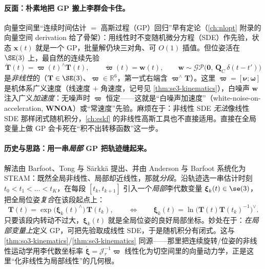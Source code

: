 \paragraph{反面：朴素地把 GP 搬上李群会卡住。}
向量空间里“连续时间估计 $=$ 高斯过程（GP）回归”早有定论（\cref{ch:nlopt} 附录的向量空间 derivation 给了骨架）：用线性时不变随机微分方程（SDE）作先验，状态 $\mathbf{x}(t)$ 就是一个 GP，批量解仍块三对角、可 $O(1)$ 插值。但位姿活在 $\SE(3)$ 上，最自然的连续先验
\begin{equation}
  \dot{\mathbf{T}}(t)=\boldsymbol{\varpi}(t)^\wedge\mathbf{T}(t),\qquad
  \dot{\boldsymbol{\varpi}}(t)=\mathbf{w}(t),\qquad
  \mathbf{w}\sim\mathcal{GP}\big(\mathbf{0},\,\mathbf{Q}_C\,\delta(t-t')\big)
  \label{eq:steam-global-sde}
\end{equation}
是\emph{非线性}的（$\mathbf{T}\in\SE(3)$、$\boldsymbol{\varpi}\in\mathbb{R}^6$，第一式右端含 $\boldsymbol{\varpi}^\wedge\mathbf{T}$）。这里 $\boldsymbol{\varpi}=[\boldsymbol{\nu};\boldsymbol{\omega}]$ 是机体系广义速度（线速度 $+$ 角速度，记号见 \cref{thm:se3-kinematics}），白噪声 $\mathbf{w}$ 注入广义\emph{加速度}：无噪声时 $\boldsymbol{\varpi}$ 恒定——这就是“白噪声加速度”（white-noise-on-acceleration, \textbf{WNOA}）或“常速度”先验。麻烦在于：非线性 SDE \emph{无法}像线性 SDE 那样闭式随机积分，\cref{ch:eskf} 的非线性高斯工具也不直接适用。直接在全局变量上做 GP 会卡死在“积不出转移函数”这一步。

\paragraph{历史与思路：用一串\emph{局部} GP 把轨迹缝起来。}
解法由 Barfoot、Tong 与 Särkkä 提出\cite{barfoot2014steam}、并由 Anderson 与 Barfoot 系统化为 STEAM\cite{anderson2015steam}：既然全局非线性、局部却近线性，那就\emph{分段}。沿轨迹选一串估计时刻 $t_0<t_1<\dots<t_K$，在每段 $[t_k,t_{k+1}]$ 引入一个\emph{局部}李代数变量 $\boldsymbol{\xi}_k(t)\in\se(3)$，把全局位姿\emph{复合}在该段起点上：
\begin{equation}
  \mathbf{T}(t)=\exp\!\big(\boldsymbol{\xi}_k(t)^\wedge\big)\,\mathbf{T}(t_k),
  \qquad\Longleftrightarrow\qquad
  \boldsymbol{\xi}_k(t)=\ln\!\big(\mathbf{T}(t)\mathbf{T}(t_k)^{-1}\big)^\vee.
  \label{eq:steam-local}
\end{equation}
只要该段内转动不过大，$\boldsymbol{\xi}_k(t)$ 就是全局位姿的良好局部坐标。妙处在于：\emph{在局部变量上}定义 GP，可把先验取成线性 SDE，于是随机积分有闭式。这与 \cref{thm:so3-kinematics}/\cref{thm:se3-kinematics} 同源——那里把连续旋转/位姿的非线性运动学用李代数坐标率 $\dot{\boldsymbol{\xi}}=\boldsymbol{\mathcal{J}}_r^{-1}\boldsymbol{\varpi}$ 线性化为切空间里的向量动力学，正是这里“化非线性为局部线性”的几何根。

